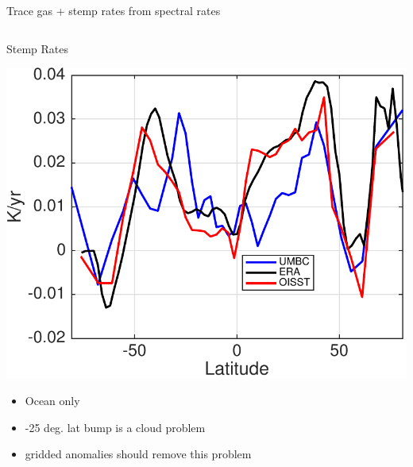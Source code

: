 \documentclass[10pt,t]{beamer}
\begin{document}
\begin{frame}{Trace gas + stemp rates from spectral rates}
\vspace{-0.3in}

\begin{columns}
\begin{column}{0.55\columnwidth}
\begin{block}{\footnotesize Stemp Rates}
\vspace{-0.1in}
\begin{center}
\includegraphics[width=\linewidth]{Figs/CloudAnom/Desc_ocean/stemp_lat_rates_from_obs_specral_rates.pdf}
\end{center}
\footnotesize
\begin{itemize}
\item   Ocean only
\item -25 deg. lat bump is a cloud problem
  \item gridded anomalies should remove this problem
\end{itemize}
\end{block}
\end{column}


\end{columns}
\end{frame}
\end{document}
